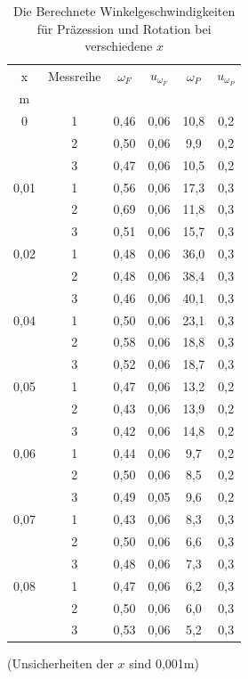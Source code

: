\documentclass[11pt,a4paper]{article} %
\begin{document}
\begin{table}[h]
	\centering
	\begin{tabular*}{0.99\textwidth}{@{\extracolsep{\fill}}cccccc}
		\toprule
		x & Messreihe & $\omega_F$ & $u_{\omega_F}$ & $\omega_P$ & $u_{\omega_P}$ \\
		m &  &    \\
		\bottomrule
		0 & 1 & 0,46 & 0,06 & 10,8 & 0,2 \\
		& 2 & 0,50 & 0,06 & 9,9 & 0,2 \\
		 & 3 & 0,47 & 0,06 & 10,5 & 0,2 \\
		0,01 & 1 & 0,56 & 0,06 & 17,3 & 0,3\\
		& 2 & 0,69 & 0,06 & 11,8 & 0,3 \\
		& 3 & 0,51 & 0,06 & 15,7 & 0,3 \\
		0,02 & 1 & 0,48 & 0,06 & 36,0  &  0,3\\
		& 2 & 0,48 &0,06 & 38,4 & 0,3  \\
		& 3 & 0,46 & 0,06 & 40,1 & 0,3 \\
		0,04 & 1 & 0,50 & 0,06 & 23,1&0,3 \\
		& 2 & 0,58 &0,06&18,8&0,3 \\
		& 3 & 0,52 &0,06&18,7&0,3 \\
		0,05 & 1 & 0,47 &0,06&13,2&0,2 \\
		& 2 & 0,43&0,06&13,9&0,2 \\
		& 3 & 0,42&0,06&14,8&0,2 \\
		0,06 & 1 & 0,44 & 0,06 &9,7&0,2 \\
		& 2 & 0,50 & 0,06&8,5&0,2 \\
		& 3 & 0,49 & 0,05&9,6&0,2 \\
		0,07 & 1 & 0,43 &0,06&8,3&0,3 \\
		& 2 & 0,50&0,06&6,6&0,3 \\
		& 3 & 0,48&0,06&7,3&0,3 \\
		0,08 & 1 & 0,47 & 0,06&6,2&0,3 \\
		& 2 & 0,50 & 0,06&6,0&0,3 \\
		& 3 & 0,53&0,06&5,2&0,3 \\
		\bottomrule
	\end{tabular*}
	\caption{Die Berechnete Winkelgeschwindigkeiten für Präzession und Rotation bei verschiedene $x$}
	\label{tabelle}
\end{table}
(Unsicherheiten der $x$ sind 0,001m)
\end{document}
